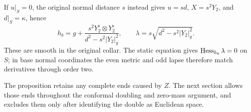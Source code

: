 If $u|_S=0$, the original normal distance $s$ instead gives
$u=sd$, $X=s^2Y_2$, and $d|_S=\kappa$, hence
\[
 h_b=g+\frac{s^2Y_2^\flat\otimes Y_2^\flat}
                    {d^2-s^2|Y_2|_g^2},
 \qquad \lambda=s\sqrt{d^2-s^2|Y_2|_g^2}.
\]
These are smooth in the original collar. The static equation gives
$\operatorname{Hess}_{h_b}\lambda=0$ on $S$; in base normal coordinates the even metric
and odd lapse therefore match derivatives through order two.

The proposition retains any complete ends caused by $Z$. The next
section allows those ends throughout the conformal doubling and
zero-mass argument, and excludes them only after identifying the double
as Euclidean space.
